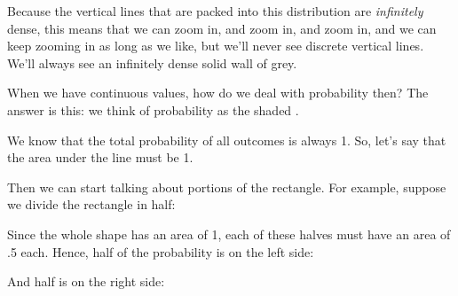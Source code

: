 \documentclass[../../../main.tex]{subfiles}
\begin{document}
\noindent
Because the vertical lines that are packed into this distribution are \emph{infinitely} dense, this means that we can zoom in, and zoom in, and zoom in, and we can keep zooming in as long as we like, but we'll never see discrete vertical lines. We'll always see an infinitely dense solid wall of grey.

When we have continuous values, how do we deal with probability then? The answer is this: we think of probability as the shaded . 

We know that the total probability of all outcomes is always 1. So, let's say that the area under the line must be 1.

Then we can start talking about portions of the rectangle. For example, suppose we divide the rectangle in half:

\begin{center}
\end{center}

\noindent
Since the whole shape has an area of 1, each of these halves must have an area of .5 each. Hence, half of the probability is on the left side:

\begin{center}
\end{center}

\noindent
And half is on the right side:

\begin{center}
\end{center}
\end{document}
